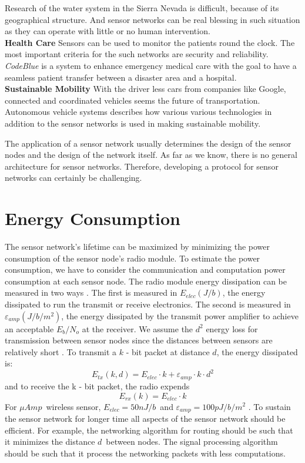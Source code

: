 	Research of the water system in the Sierra Nevada is difficult, because of its geographical structure.
	And sensor networks can be real blessing in such situation as they can operate with little or no human intervention.\\
	\textbf{Health Care} 
	Sensors can be used to monitor the patients round the clock. The most important criteria for the such networks are security and reliability.
	\textit{CodeBlue} \cite{lorincz2004sensor} is a system to enhance emergency medical care with the goal to have a seamless patient transfer between a disaster area and a hospital.\\
	\textbf{Sustainable Mobility} 
	With the driver less cars from companies like Google, connected and coordinated vehicles seems the future of transportation.
	Autonomous vehicle systems \cite{benenson2008towards} describes how various various technologies in addition to the sensor networks is used in making sustainable mobility. 

	The application of a sensor network usually determines the design of the sensor nodes and the design of the network itself.
	As far as we know, there is no general architecture for sensor networks.
	Therefore, developing a protocol for sensor networks can certainly be challenging. 

\section{Energy Consumption}
	The sensor network's lifetime can be maximized by minimizing the power consumption of the sensor node's radio module.
	To estimate the power consumption, we have to consider the communication and computation power consumption at each sensor node.
	The radio module energy dissipation can be measured in two ways \cite{wang2002energy}.
	The first is measured in $E_{elec} (J/b)$, the energy dissipated to run the transmit or receive electronics.
	The second is measured in $\varepsilon_{amp} (J/b/m^2)$, the energy dissipated by the transmit power amplifier to achieve an acceptable $E_{b} / N_{o} $ at the receiver.
	We assume the $d^2$ energy loss for transmission between sensor nodes since the distances between sensors are relatively short \cite{ettus1998system}. 
	To transmit a $k$ - bit packet at distance $d$, the energy dissipated is:
	\begin{equation}
		E_{tx}(k, d) = E_{elec} \cdot k + \varepsilon_{amp} \cdot k \cdot d^{2}
	\end{equation}
	and to receive the k - bit packet, the radio expends
	\begin{equation}
		E_{rx}(k) = E_{elec} \cdot k
	\end{equation}
	For $\mu Amp$\ wireless sensor, $E_{elec} = 50nJ/b$\ and $\varepsilon_{amp} = 100pJ/b/m^2$ \cite{wang2002energy}.
	To sustain the sensor network for longer time all aspects of the sensor network should be efficient.
	For example, the networking algorithm for routing should be such that it minimizes the distance $d$\ between nodes.
	The signal processing algorithm should be such that it process the networking packets with less computations.

